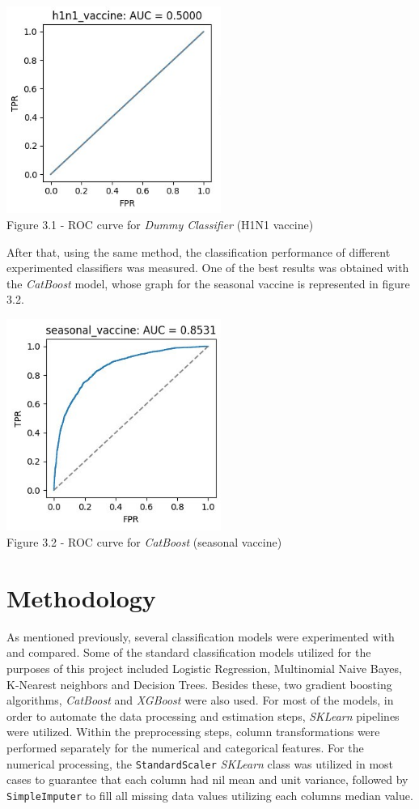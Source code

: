 \documentclass{IEEEtran}
\begin{document}
\begin{center}
    \includegraphics[width=7cm]{figures/ROC_Dummy_Classifier.png}\\
    Figure 3.1 - ROC curve for \textit{Dummy Classifier} (H1N1 vaccine)
\end{center}

After that, using the same method, the classification performance of different experimented classifiers was measured. One of the best results was obtained with the \textit{CatBoost} model, whose graph for the seasonal vaccine is represented in figure 3.2.

\begin{center}
    \includegraphics[width=7cm]{figures/ROC_CatBoost.png}\\
    Figure 3.2 - ROC curve for \textit{CatBoost} (seasonal vaccine)
\end{center}

\section{Methodology}
As mentioned previously, several classification models were experimented with and compared. Some of the standard classification models utilized for the purposes of this project included Logistic Regression, Multinomial Naive Bayes, K-Nearest neighbors and Decision Trees. Besides these, two gradient boosting algorithms, \textit{CatBoost} and \textit{XGBoost} were also used.
For most of the models, in order to automate the data processing and estimation steps, \textit{SKLearn} pipelines were utilized. Within the preprocessing steps, column transformations were performed separately for the numerical and categorical features. For the numerical processing, the \texttt{StandardScaler} \textit{SKLearn} class was utilized in most cases to guarantee that each column had nil mean and unit variance, followed by \texttt{SimpleImputer} to fill all missing data values utilizing each columns median value.
\end{document}
